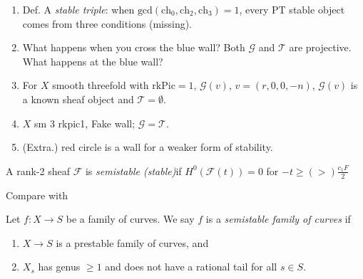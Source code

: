 \begin{enumerate}
\medskip
\item Def. A {\it stable triple}: when
$\text{gcd}(\text{ch}_0,\text{ch}_2,\text{ch}_3)=1$, every PT stable object
comes from three conditions (missing).
\item What happens when you cross the blue wall? 
Both $\mathcal{G}$ and $\mathcal{T}$ are projective. What happens at the blue
wall?
\medskip
\item For $X$ smooth threefold with $\text{rk}\text{Pic}=1$, $\mathcal{G}(v)$,
$v=(r,0,0,-n)$, $\mathcal{G}(v)$ is a known sheaf object and
$\mathcal{T}=\emptyset$.
\item $X$ sm 3 rkpic1, Fake wall; $\mathcal{G}=\mathcal{T}$.
\item (Extra.) red circle is a wall for a weaker form of stability.
\end{enumerate}
\begin{definition}
\label{definition-slope-stability}
A rank-2 sheaf $\mathcal{F}$ is {\it semistable (stable)}if
$H^{0}(\mathcal{F}(t))=0$ for $-t \geq(>) \frac{c_1F}{2}$
\end{definition}

Compare with

\begin{definition}
\label{definition-semistable}
Let $f : X \to S$ be a family of curves.
We say $f$ is a {\it semistable family of curves} if
\begin{enumerate}
\item $X \to S$ is a prestable family of curves, and
\item $X_s$ has genus $\geq 1$ and
does not have a rational tail for all $s \in S$.
\end{enumerate}
\end{definition}

